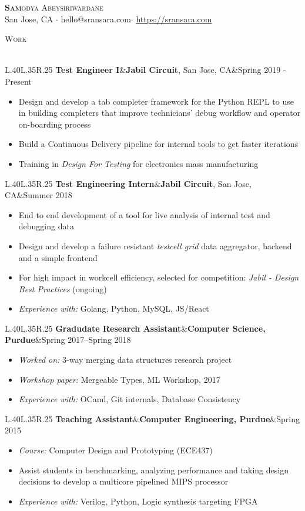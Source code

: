 \documentclass[a4paper]{article}
\newcommand{\header} [1] {
    {\hspace*{-18pt}\vspace*{6pt} \textsc{#1}
    \vspace*{-14pt} \\ \hspace*{-18pt} \hrulefill{} \\
    \vspace{1mm}}
}
\newcommand{\threeparts} [3] {
    {\setlength\tabcolsep{0pt}
    \begin{tabularx}{\linewidth}{L{.40\linewidth}L{.35\linewidth}R{.25\linewidth}} 
    \textbf{#1}&#2&#3
    \end{tabularx}}
}
\begin{document}
\begin{center}
	{\Huge \scshape {\textbf{Sam}odya Abeysiriwardane}}\\
	San Jose, CA $\cdot$ hello@sransara.com$\cdot$ \url{https://sransara.com}\\
\end{center}

\header{Work}
\threeparts{Test Engineer I}{\textbf{Jabil Circuit}, San Jose, CA}{Spring 2019 - Present}
\begin{itemize}[label=$\square$]
	\item Design and develop a tab completer framework for the Python REPL to use in building completers that improve technicians' debug workflow and operator on-boarding process
    \item Build a Continuous Delivery pipeline for internal tools to get faster iterations
    \item Training in \textit{Design For Testing} for electronics mass manufacturing
\end{itemize}
\threeparts{Test Engineering Intern}{\textbf{Jabil Circuit}, San Jose, CA}{Summer 2018}
\begin{itemize}[label=$\square$]
	\item End to end development of a tool for live analysis of internal test and debugging data
    \item Design and develop a failure resistant \textit{testcell grid} data aggregator, backend and a simple frontend
    \item For high impact in workcell efficiency, selected for competition: \textit{Jabil - Design Best Practices} (ongoing) 
    \item \textit{Experience with:} Golang, Python, MySQL, JS/React
\end{itemize}
\threeparts{Gradudate Research Assistant}{\textbf{Computer Science, Purdue}}{Spring 2017--Spring 2018}
\begin{itemize}[label=$\square$]
    \item \textit{Worked on:} 3-way merging data structures research project
    \item \textit{Workshop paper:} Mergeable Types, ML Workshop, 2017
	\item \textit{Experience with:} OCaml, Git internals, Database Consistency
\end{itemize}
\threeparts{Teaching Assistant}{\textbf{Computer Engineering, Purdue}}{Spring 2015}
\begin{itemize}[label=$\square$]
	\item \textit{Course:} Computer Design and Prototyping (ECE437)
    \item Assist students in benchmarking, analyzing performance and taking design decisions to develop a multicore pipelined MIPS processor
    \item \textit{Experience with:} Verilog, Python, Logic synthesis targeting FPGA
\end{itemize}
\end{document}
